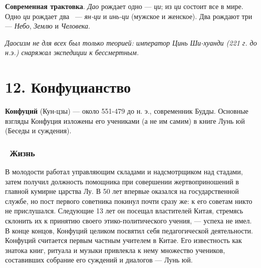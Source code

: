\documentclass[twoside,a4paper]{article}
\begin{document}
{
\textbf{Современная трактовка}. \textit{Дао }рождает одно — \textit{ци}; из \textit{ци} состоит все в мире. Одно
\textit{ци} рождает два \ — \textit{ян-ци} и \textit{инь-ци} (мужское и женское). Два рождают три — \textit{Небо},
\textit{Землю} и \textit{Человека}. }

{\itshape
Даосизм не для всех был {\textquotedbl}только теорией{\textquotedbl}: император Цинь Ши-хуанди (221 г. до н.э.) снаряжал
экспедиции к бессмертным. }


\bigskip

\section[12. Конфуцианство]{ 12. Конфуцианство}
{
\textbf{Конфуций} (Кун-цзы) — около 551-479 до н. э., современник Будды. Основные взгляды Конфуция изложены его
учениками (а не им самим) в книге {\textquotedbl}Лунь юй{\textquotedbl} ({\textquotedbl}Беседы и
суждения{\textquotedbl}).}

\subsubsection[\ Жизнь]{\ Жизнь}
{
В молодости работал управляющим складами и надсмотрщиком над стадами, затем получил должность помощника при совершении
жертвоприношений в главной кумирне царства Лу. В 50 лет впервые оказался на государственной службе, но пост первого
советника покинул почти сразу же: к его советам никто не прислушался. Следующие 13 лет он посещал властителей Китая,
стремясь склонить их к принятию своего этико-политического учения, — успеха не имел. В конце концов, Конфуций целиком
посвятил себя педагогической деятельности. Конфуций считается первым частным учителем в Китае. Его известность как
знатока книг, ритуала и музыки привлекла к нему множество учеников, составивших собрание его суждений и диалогов —
{\textquotedbl}Лунь юй{\textquotedbl}. }
\end{document}
